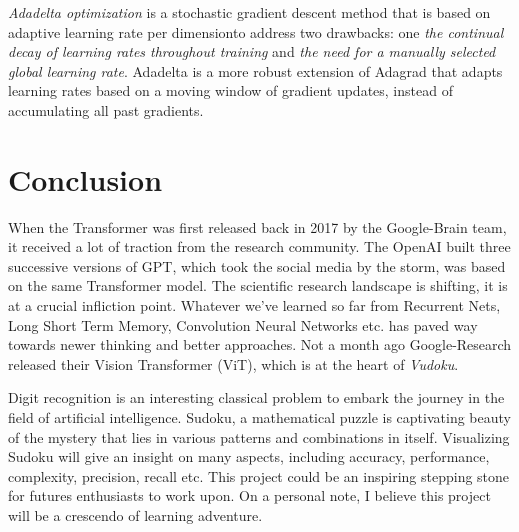 \documentclass[12pt, a4paper]{report}
\begin{document}
\textit{Adadelta optimization} is a stochastic gradient descent method that is based on adaptive learning rate per dimensionto address two drawbacks: one \textit{the continual decay of learning rates throughout training} and \textit{the need for a manually selected global learning rate}. Adadelta is a more robust extension of Adagrad that adapts learning rates based on a moving window of gradient updates, instead of accumulating all past gradients.
\vspace*{\fill}

\chapter{Conclusion}
\label{chap:conclusion}
\thispagestyle{fancy}
\hspace{0.5cm} When the Transformer was first released back in 2017 by the Google-Brain team, it received a lot of traction from the research community. The OpenAI built three successive versions of GPT, which took the social media by the storm, was based on the same Transformer model. The scientific research landscape is shifting, it is at a crucial infliction point. Whatever we've learned so far from Recurrent Nets, Long Short Term Memory, Convolution Neural Networks etc. has paved way towards newer thinking and better approaches. Not a month ago Google-Research released their Vision Transformer (ViT), which is at the heart of \emph{Vudoku}.

Digit recognition is an interesting classical problem to embark the journey in the field of artificial intelligence. Sudoku, a mathematical puzzle is captivating beauty of the mystery that lies in various patterns and combinations in itself. Visualizing Sudoku will give an insight on many aspects, including accuracy, performance, complexity, precision, recall etc. This project could be an inspiring stepping stone for futures enthusiasts to work upon. On a personal note, I believe this project will be a crescendo of learning adventure.
\vspace*{\fill}



\thispagestyle{fancy}
\end{document}
